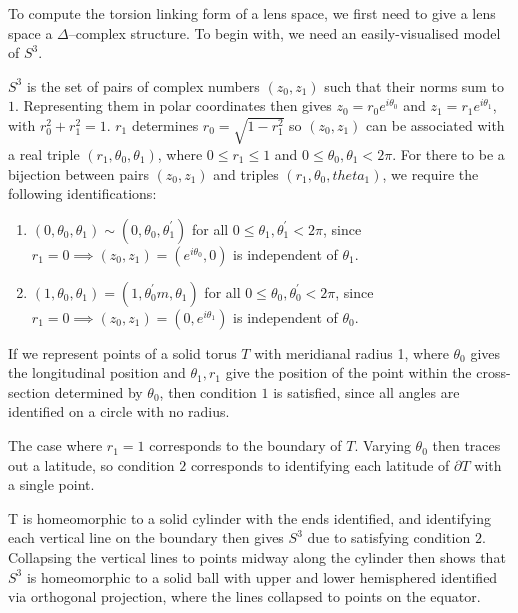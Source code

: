 \documentclass{article}
\begin{document}
To compute the torsion linking form of a lens space, we first need to give a lens space a $\Delta$--complex structure. To begin with, we need an easily-visualised model of $S^3$.

$S^3$ is the set of pairs of complex numbers $(z_0,z_1)$ such that their norms sum to $1$. Representing them in polar coordinates then gives $z_0=r_0e^{i\theta_0}$ and $z_1=r_1e^{i\theta_1}$, with $r_0^2+r_1^2=1$. $r_1$ determines $r_0=\sqrt{1-r_1^2}$ so $(z_0,z_1)$ can be associated with a real triple $(r_1,\theta_0,\theta_1)$, where $0\leq r_1\leq 1$ and $0\leq\theta_0,\theta_1<2\pi$.
For there to be a bijection between pairs $(z_0,z_1)$ and triples $(r_1,\theta_0,theta_1)$, we require the following identifications:
\begin{enumerate}
\item $(0,\theta_0,\theta_1)\sim(0,\theta_0,\theta_1^{'})$ for all $0\leq\theta_1,\theta_1^{'}<2\pi$, since $r_1=0\implies (z_0,z_1)=(e^{i\theta_0},0)$ is independent of $\theta_1$.
\item $(1,\theta_0,\theta_1)=(1,\theta_0^{'}m,\theta_1)$ for all $0\leq\theta_0,\theta_0^{'}<2\pi$, since $r_1=0\implies (z_0,z_1)=(0,e^{i\theta_1})$ is independent of $\theta_0$.
\end{enumerate}

If we represent points of a solid torus $T$ with meridianal radius 1, where $\theta_0$ gives the longitudinal position and $\theta_1,r_1$ give the position of the point within the cross-section determined by $\theta_0$, then condition $1$ is satisfied, since all angles are identified on a circle with no radius.

The case where $r_1=1$ corresponds to the boundary of $T$. Varying $\theta_0$ then traces out a latitude, so condition $2$ corresponds to identifying each latitude of $\partial T$ with a single point.

T is homeomorphic to a solid cylinder with the ends identified, and identifying each vertical line on the boundary then gives $S^3$ due to satisfying condition $2$. Collapsing the vertical lines to points midway along the cylinder then shows that $S^3$ is homeomorphic to a solid ball with upper and lower hemisphered identified via orthogonal projection, where the lines collapsed to points on the equator.\\
\end{document}
